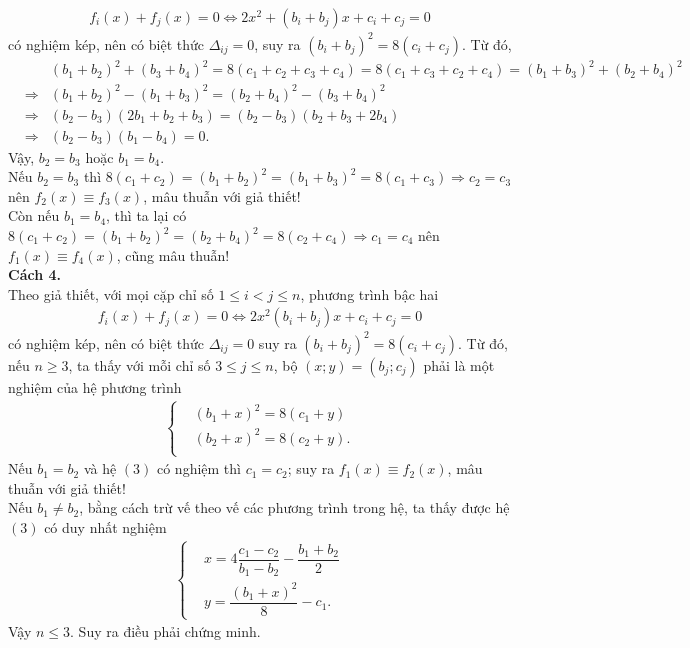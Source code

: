 \begin{bt}
{	\begin{align*}
	f_{i}(x)+f_{j}(x)=0 \Leftrightarrow 2x^{2}+\left(b_{i}+b_{j}\right)x+c_{i}+c_{j}=0
	\end{align*} có nghiệm kép, nên có biệt thức $\Delta_{ij}=0$, suy ra $(b_{i}+b_{j})^{2}=8(c_{i}+c_{j})$. Từ đó,
	\begin{eqnarray*}
	& & (b_{1}+b_{2})^{2}+(b_{3}+b_{4})^{2} = 8(c_{1}+c_{2}+c_{3}+c_{4})=8(c_{1}+c_{3}+c_{2}+c_{4}) = (b_{1}+b_{3})^{2}+(b_{2}+b_{4})^{2}\\
	&\Rightarrow & (b_{1}+b_{2})^{2}-(b_{1}+b_{3})^{2} = (b_{2}+b_{4})^{2}-(b_{3}+b_{4})^{2}\\
	&\Rightarrow & (b_{2}-b_{3})(2b_{1}+b_{2}+b_{3})=(b_{2}-b_{3})(b_{2}+b_{3}+2b_{4})\\
	&\Rightarrow & (b_{2}-b_{3})(b_{1}-b_{4})=0.
	\end{eqnarray*}
	Vậy, $b_{2}=b_{3}$ hoặc $b_{1}=b_{4}$.\\
	Nếu $b_{2}=b_{3}$ thì $8(c_{1}+c_{2})=(b_{1}+b_{2})^{2}=(b_{1}+b_{3})^{2}=8(c_{1}+c_{3})\Rightarrow c_{2}=c_{3}$ nên $f_{2}(x)\equiv f_{3}(x)$, mâu thuẫn với giả thiết!\\
	Còn nếu $b_{1}=b_{4}$, thì ta lại có $8(c_{1}+c_{2}) = (b_{1}+b_{2})^{2} =(b_{2}+b_{4})^{2} =8(c_{2}+c_{4})\Rightarrow c_{1}=c_{4}$ nên $f_{1}(x)\equiv f_{4}(x)$, cũng mâu thuẫn!\\
	\textbf{Cách 4.} \\
	Theo giả thiết, với mọi cặp chỉ số $1\leq i <j \leq n$, phương trình bậc hai
	\begin{align*} f_{i}(x)+f_{j}(x)=0 \Leftrightarrow 2x^{2}\left(b_{i}+b_{j}\right)x+c_{i}+c_{j}=0
	\end{align*} có nghiệm kép, nên có biệt thức $\Delta_{ij}=0$ suy ra $\left(b_{i}+b_{j}\right)^{2}=8\left(c_{i}+c_{j}\right)$. Từ đó, nếu $n\geq 3$, ta thấy với mỗi chỉ số $3\leq j\leq n$, bộ $(x;y)=(b_{j};c_{j})$ phải là một nghiệm của hệ phương trình \begin{align}
	\left\{\begin{aligned}
	&(b_{1}+	x)^{2} = 8(c_{1}+y) \\
	&(b_{2}+	x)^{2} = 8(c_{2}+y). \\
	\end{aligned}\right. \tag{3}
	\end{align}
	Nếu $b_{1}=b_{2}$ và hệ $(3)$ có nghiệm thì $c_{1}=c_{2}$; suy ra $f_{1}(x)\equiv f_{2}(x)$, mâu thuẫn với giả thiết!\\
	Nếu $b_{1}\ne b_{2}$, bằng cách trừ vế theo vế các phương trình trong hệ, ta thấy được hệ $(3)$ có duy nhất nghiệm
	\begin{align*}
	\left\{\begin{aligned}
	&x=4\dfrac{	c_{1}-	c_{2}}{	b_{1}-	b_{2}}-\dfrac{	b_{1}+	b_{2}}{2} \\
	&y=\dfrac{	(b_{1}+x)^{2}}{8}-c_{1}.
	\end{aligned}\right.
	\end{align*}
	 Vậy $n\leq 3$. Suy ra điều phải chứng minh.
	}
\end{bt}

